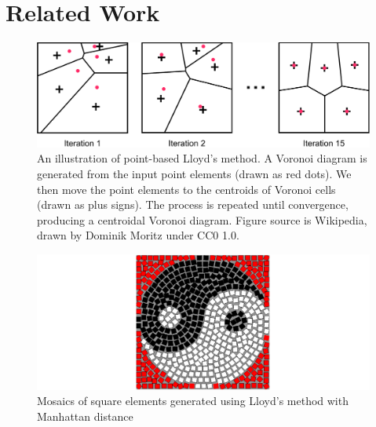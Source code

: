 
\chapter{Related Work}
\label{chapter_related_work}

\begin{figure}
\centering
\includegraphics[width=1.0\textwidth]{figures/related/lloyds_method.pdf} 
\caption[An illustration of Lloyd's method.]
{\label{fig_lloyds_method} 
\newtext
{
An illustration of point-based Lloyd's method.
A Voronoi diagram is generated from the input point elements (drawn as red dots).
We then move the point elements to the centroids of Voronoi cells (drawn as plus signs).
The process is repeated until convergence, producing a centroidal Voronoi diagram.
Figure source is Wikipedia, drawn by Dominik Moritz under CC0 1.0.
}
}
\end{figure}


\begin{figure}
\centering
\includegraphics[width=1.0\textwidth]{figures/related/hausner.pdf} 
\caption[Decorative mosaics using Lloyd's method]
{\label{fig_related_hausner} 
\newtext
{
Mosaics of square elements generated using Lloyd's method with Manhattan distance~\cite{Hausner2001}
}
}
\end{figure}





